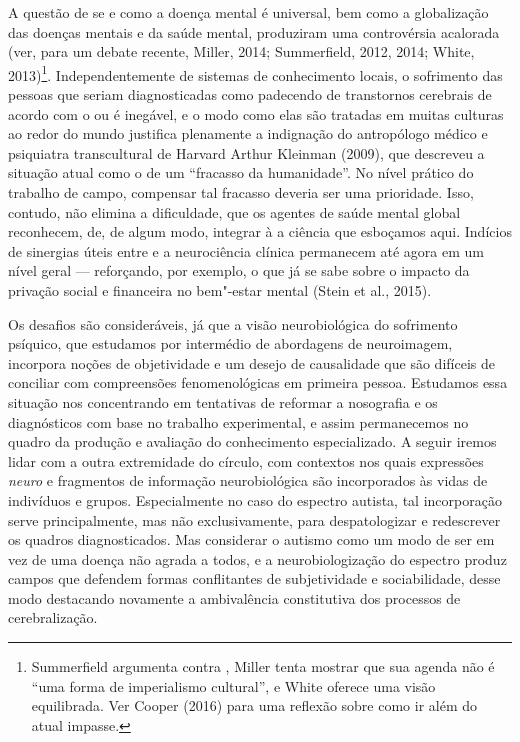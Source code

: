 A questão de se e como a doença mental é universal, bem como a
globalização das doenças mentais e da saúde mental, produziram uma
controvérsia acalorada (ver, para um debate recente, Miller, 2014;
Summerfield, 2012, 2014; White, 2013)\footnote[6]{Summerfield argumenta contra , Miller tenta mostrar que sua
agenda não é ``uma forma de imperialismo cultural'', e White oferece uma
visão equilibrada. Ver Cooper (2016) para uma reflexão sobre como ir
além do atual impasse.}.
Independentemente de sistemas de conhecimento locais, o sofrimento das
pessoas que seriam diagnosticadas como padecendo de transtornos
cerebrais de acordo com o \emph{} ou \emph{} é inegável, e o modo
como elas são tratadas em muitas culturas ao redor do mundo justifica
plenamente a indignação do antropólogo médico e psiquiatra transcultural
de Harvard Arthur Kleinman (2009), que descreveu a situação atual como o
de um ``fracasso da humanidade''. No nível prático do trabalho de campo,
compensar tal fracasso deveria ser uma prioridade. Isso, contudo, não
elimina a dificuldade, que os agentes de saúde mental global reconhecem,
de, de algum modo, integrar à  a ciência que esboçamos aqui. Indícios
de sinergias úteis entre  e a neurociência clínica permanecem até
agora em um nível geral --- reforçando, por exemplo, o que já se sabe
sobre o impacto da privação social e financeira no bem"-estar mental
(Stein et al., 2015).

Os desafios são consideráveis, já que a visão neurobiológica do
sofrimento psíquico, que estudamos por intermédio de abordagens de
neuroimagem, incorpora noções de objetividade e um desejo de causalidade
que são difíceis de conciliar com compreensões fenomenológicas em
primeira pessoa. Estudamos essa situação nos concentrando em tentativas
de reformar a nosografia e os diagnósticos com base no trabalho
experimental, e assim permanecemos no quadro da produção e avaliação do
conhecimento especializado. A seguir iremos lidar com a outra
extremidade do círculo, com contextos nos quais expressões \emph{neuro}
e fragmentos de informação neurobiológica são incorporados às vidas de
indivíduos e grupos. Especialmente no caso do espectro autista, tal
incorporação serve principalmente, mas não exclusivamente, para
despatologizar e redescrever os quadros diagnosticados. Mas considerar o
autismo como um modo de ser em vez de uma doença não agrada a todos, e a
neurobiologização do espectro produz campos que defendem formas
conflitantes de subjetividade e sociabilidade, desse modo destacando
novamente a ambivalência constitutiva dos processos de cerebralização.

